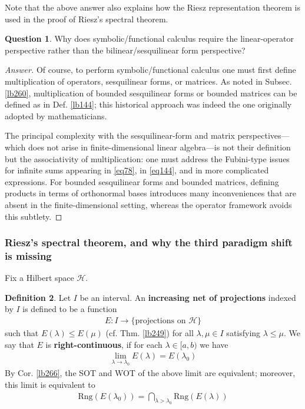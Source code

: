 \documentclass[12pt,b5paper,notitlepage]{article}
\theoremstyle{definition}
\newtheorem{df}{Definition}[subsection]
\newtheorem{question}[df]{Question}
\theoremstyle{plain}
\newcommand{\Rng}{\mathrm{Rng}}
\newcommand{\MH}{\mathcal H}
\numberwithin{equation}{section}
\begin{document}
Note that the above answer also explains how the Riesz representation theorem is used in the proof of Riesz's spectral theorem.




\begin{question}
Why does symbolic/functional calculus require the linear-operator perspective rather than the bilinear/sesquilinear form perspective?
\end{question}



\begin{proof}[Answer]
Of course, to perform symbolic/functional calculus one must first define multiplication of operators, sesquilinear forms, or matrices. As noted in Subsec. \ref{lb260}, multiplication of bounded sesquilinear forms or bounded matrices can be defined as in Def. \ref{lb144}; this historical approach was indeed the one originally adopted by mathematicians. 

The principal complexity with the sesquilinear-form and matrix perspectives---which does not arise in finite-dimensional linear algebra---is not their definition but the associativity of multiplication: one must address the Fubini-type issues for infinite sums appearing in \eqref{eq78}, in \eqref{eq144}, and in more complicated expressions. For bounded sesquilinear forms and bounded matrices, defining products in terms of orthonormal bases introduces many inconveniences that are absent in the finite-dimensional setting, whereas the operator framework avoids this subtlety.
\end{proof}


\subsubsection{Riesz's spectral theorem, and why the third paradigm shift is missing}


Fix a Hilbert space $\MH$. 

\begin{df}
Let $I$ be an interval. An \textbf{increasing net of projections} indexed by $I$ is defined to be a function
\begin{align*}
E:I\rightarrow\{\text{projections on }\MH\}
\end{align*}
such that $E(\lambda)\leq E(\mu)$ (cf. Thm. \ref{lb249}) for all $\lambda,\mu\in I$ satisfying $\lambda\leq\mu$. We say that $E$ is \textbf{right-continuous}, if for each $\lambda\in[a,b)$ we have
\begin{align}
\lim_{\lambda\rightarrow\lambda_0} E(\lambda)=E(\lambda_0)
\end{align}
By Cor. \ref{lb266}, the SOT and WOT of the above limit are equivalent; moreover, this limit is equivalent to
\begin{align*}
\Rng(E(\lambda_0))=\bigcap_{\lambda>\lambda_0}\Rng(E(\lambda))
\end{align*}
\end{df}
\end{document}
